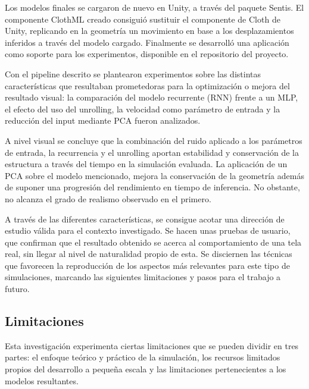Los modelos finales se cargaron de nuevo en Unity, a través del paquete Sentis. El componente ClothML creado consiguió sustituir el componente de Cloth de Unity, replicando en la geometría un movimiento en base a los desplazamientos inferidos a través del modelo cargado. Finalmente se desarrolló una aplicación como soporte para los experimentos, disponible en el repositorio del proyecto. \newline

Con el pipeline descrito se plantearon experimentos sobre las distintas características que resultaban prometedoras para la optimización o mejora del resultado visual: la comparación del modelo recurrente (RNN) frente a un MLP, el efecto del uso del unrolling, la velocidad como parámetro de entrada y la reducción del input mediante PCA fueron analizados. \newline

A nivel visual se concluye que la combinación del ruido aplicado a los parámetros de entrada, la recurrencia y el unrolling aportan estabilidad y conservación de la estructura a través del tiempo en la simulación evaluada. La aplicación de un PCA sobre el modelo mencionado, mejora la conservación de la geometría además de suponer una progresión del rendimiento en tiempo de inferencia. No obstante, no alcanza el grado de realismo observado en el primero. \newline

A través de las diferentes características, se consigue acotar una dirección de estudio válida para el contexto investigado. Se hacen unas pruebas de usuario, que confirman que el resultado obtenido se acerca al comportamiento de una tela real, sin llegar al nivel de naturalidad propio de esta. Se disciernen las técnicas que favorecen la reproducción de los aspectos más relevantes para este tipo de simulaciones, marcando las siguientes limitaciones y pasos para el trabajo a futuro. 

\subsection{Limitaciones}
Esta investigación experimenta ciertas limitaciones que se pueden dividir en tres partes: el enfoque teórico y práctico de la simulación, los recursos limitados propios del desarrollo a pequeña escala y las limitaciones pertenecientes a los modelos resultantes.\newline

